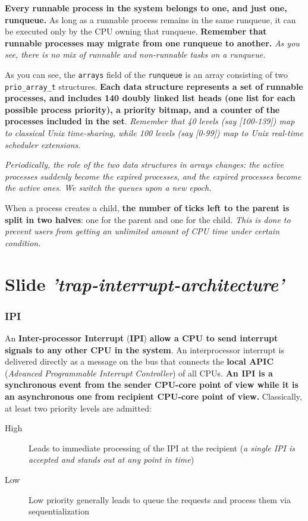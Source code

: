 \documentclass[10pt,a4paper]{article}
\begin{document}
\textbf{Every runnable process in the system belongs to one, and just one, runqueue.} As long as a runnable process remains in the same runqueue, it can be executed only by the CPU owning that runqueue. \textbf{Remember that runnable processes may migrate from one runqueue to another.} \textit{As you see, there is no mix of runnable and non-runnable tasks on a runqueue.}

As you can see, the \texttt{arrays} field of the \texttt{runqueue} is an array consisting of two \texttt{prio\_array\_t} structures. \textbf{Each data structure represents a set of runnable processes, and includes 140 doubly linked list heads (one list for each possible process priority), a priority bitmap, and a counter of the processes included in the set}. \textit{Remember that 40 levels (say [100-139]) map to classical Unix time-sharing, while 100 levels (say [0-99]) map to Unix real-time scheduler extensions}.

\textit{Periodically, the role of the two data structures in arrays changes: the active processes suddenly become the expired processes, and the expired processes become the active ones. We switch the queues upon a new epoch.}

When a process creates a child, \textbf{the number of ticks left to the parent is split in two halves}: one for the parent and one for the child. \textit{This is done to prevent users from getting an unlimited amount of CPU time under certain condition.}



\newpage
\section{Slide \textit{'trap-interrupt-architecture'}}

\subsubsection{IPI}

An \textbf{Inter-processor Interrupt} (\textbf{IPI}) \textbf{allow a CPU to send interrupt signals to any other CPU in the system}. An interprocessor interrupt is delivered directly as a message on the bus that connects the \textbf{local APIC} (\textit{Advanced Programmable Interrupt Controller}) of all CPUs. \textbf{An IPI is a synchronous event from the sender CPU-core point of view while it is an asynchronous one from recipient CPU-core point of view.}
Classically, at least two priority levels are admitted:
\begin{description}
\item[High] Leads to immediate processing of the IPI at the recipient (\textit{a single IPI is accepted and stands out at any point in time})
\item[Low] Low priority generally leads to queue the requests and process them via sequentialization
\end{description}
\end{document}
